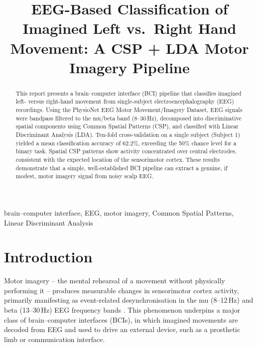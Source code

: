 \documentclass[conference]{IEEEtran}
\begin{document}
\title{EEG-Based Classification of Imagined Left vs.\ Right Hand Movement: A CSP + LDA Motor Imagery Pipeline}

\author{
}

\maketitle

\begin{abstract}
This report presents a brain--computer interface (BCI) pipeline that classifies imagined left- versus right-hand movement from single-subject electroencephalography (EEG) recordings. Using the PhysioNet EEG Motor Movement/Imagery Dataset, EEG signals were bandpass filtered to the mu/beta band (8--30\,Hz), decomposed into discriminative spatial components using Common Spatial Patterns (CSP), and classified with Linear Discriminant Analysis (LDA). Ten-fold cross-validation on a single subject (Subject 1) yielded a mean classification accuracy of 62.2\%, exceeding the 50\% chance level for a binary task. Spatial CSP patterns show activity concentrated over central electrodes, consistent with the expected location of the sensorimotor cortex. These results demonstrate that a simple, well-established BCI pipeline can extract a genuine, if modest, motor imagery signal from noisy scalp EEG.
\end{abstract}

\begin{IEEEkeywords}
brain--computer interface, EEG, motor imagery, Common Spatial Patterns, Linear Discriminant Analysis
\end{IEEEkeywords}

\section{Introduction}

Motor imagery -- the mental rehearsal of a movement without physically performing it -- produces measurable changes in sensorimotor cortex activity, primarily manifesting as event-related desynchronisation in the mu (8--12\,Hz) and beta (13--30\,Hz) EEG frequency bands \cite{pfurtscheller1999}. This phenomenon underpins a major class of brain--computer interfaces (BCIs), in which imagined movements are decoded from EEG and used to drive an external device, such as a prosthetic limb or communication interface.
\end{document}
